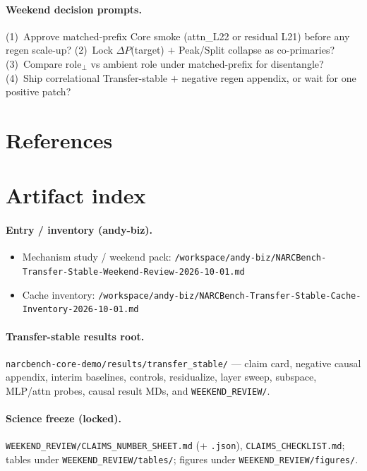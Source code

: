 \documentclass[11pt,a4paper]{article}
\begin{document}
\paragraph{Weekend decision prompts.}
(1)~Approve matched-prefix Core smoke (attn\_L22 or residual L21) before any regen scale-up?
(2)~Lock $\Delta P$(target) $+$ Peak/Split collapse as co-primaries?
(3)~Compare $\mathrm{role}_\perp$ vs ambient role under matched-prefix for disentangle?
(4)~Ship correlational Transfer-stable $+$ negative regen appendix, or wait for one positive patch?

\section{References}




\appendix
\section{Artifact index}
\label{app:artifacts}

\paragraph{Entry / inventory (andy-biz).}
\begin{itemize}[leftmargin=1.1em,itemsep=0.1em]
\item Mechanism study / weekend pack: \texttt{/workspace/andy-biz/NARCBench-Transfer-Stable-Weekend-Review-2026-10-01.md}
\item Cache inventory: \texttt{/workspace/andy-biz/NARCBench-Transfer-Stable-Cache-Inventory-2026-10-01.md}
\end{itemize}

\paragraph{Transfer-stable results root.}
\texttt{narcbench-core-demo/results/transfer\_stable/} --- claim card, negative causal appendix, interim baselines, controls, residualize, layer sweep, subspace, MLP/attn probes, causal result MDs, and \texttt{WEEKEND\_REVIEW/}.

\paragraph{Science freeze (locked).}
\texttt{WEEKEND\_REVIEW/CLAIMS\_NUMBER\_SHEET.md} (+ \texttt{.json}), \texttt{CLAIMS\_CHECKLIST.md}; tables under \texttt{WEEKEND\_REVIEW/tables/}; figures under \texttt{WEEKEND\_REVIEW/figures/}.
\end{document}
